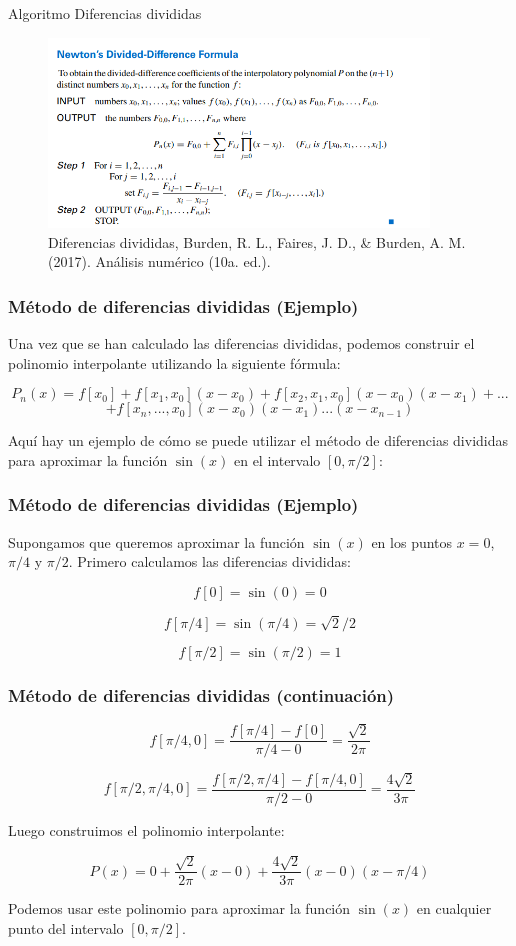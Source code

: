 \documentclass{beamer}
\begin{document}
\begin{frame}{Algoritmo Diferencias divididas}
 \begin{figure}
    \includegraphics[width=0.9\textwidth]{dividdas.png}
    \caption{Diferencias divididas, Burden, R. L., Faires, J. D., & Burden, A. M. (2017). Análisis numérico (10a. ed.).  } 
\end{figure} 
\end{frame}



\begin{frame}
\frametitle{Método de diferencias divididas (Ejemplo)}

Una vez que se han calculado las diferencias divididas, podemos construir el polinomio interpolante utilizando la siguiente fórmula:

\[
P_n(x) = f[x_0] + f[x_1,x_0](x - x_0) + f[x_2,x_1,x_0](x - x_0)(x - x_1) + ...
\]
\[
 + f[x_n,...,x_0](x - x_0)(x - x_1)...(x - x_{n-1})
 \]
 
Aquí hay un ejemplo de cómo se puede utilizar el método de diferencias divididas para aproximar la función $\sin(x)$ en el intervalo $[0,\pi/2]$:

\end{frame}

\begin{frame}
\frametitle{Método de diferencias divididas (Ejemplo)}
Supongamos que queremos aproximar la función $\sin(x)$ en los puntos $x = 0$, $\pi/4$ y $\pi/2$. Primero calculamos las diferencias divididas:

$$
f[0] = \sin(0) = 0
$$

$$
f[\pi/4] = \sin(\pi/4) = \sqrt{2}/2
$$

$$
f[\pi/2] = \sin(\pi/2) = 1
$$

\end{frame}

\begin{frame}
\frametitle{Método de diferencias divididas (continuación)}

$$
f[\pi/4, 0] = \frac{f[\pi/4] - f[0]}{\pi/4 - 0} = \frac{\sqrt{2}}{2\pi}
$$

$$
f[\pi/2, \pi/4, 0] = \frac{f[\pi/2, \pi/4] - f[\pi/4, 0]}{\pi/2 - 0} = \frac{4\sqrt{2}}{3\pi}
$$

Luego construimos el polinomio interpolante:

$$
P(x) = 0 + \frac{\sqrt{2}}{2\pi}(x - 0) + \frac{4\sqrt{2}}{3\pi}(x - 0)(x - \pi/4)
$$

Podemos usar este polinomio para aproximar la función $\sin(x)$ en cualquier punto del intervalo $[0,\pi/2]$.

\end{frame}
\end{document}
